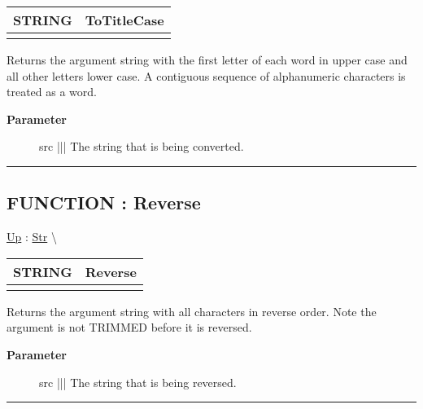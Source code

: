 {\renewcommand{\arraystretch}{1.5}
\begin{tabularx}{\textwidth}{|>{\raggedright\arraybackslash}l|X|}
\hline
\hspace{0pt}STRING & ToTitleCase \\
\hline
\multicolumn{2}{|>{\raggedright\arraybackslash}X|}{\hspace{0pt}(STRING src)} \\
\hline
\end{tabularx}
}

\par
Returns the argument string with the first letter of each word in upper case and all other letters lower case. A contiguous sequence of alphanumeric characters is treated as a word.

\par
\begin{description}
\item [\textbf{Parameter}] src ||| The string that is being converted.
\end{description}

\rule{\linewidth}{0.5pt}
\subsection*{FUNCTION : Reverse}
\hypertarget{ecldoc:str.reverse}{}
\hyperlink{ecldoc:Str}{Up} :
\hspace{0pt} \hyperlink{ecldoc:Str}{Str} \textbackslash 

{\renewcommand{\arraystretch}{1.5}
\begin{tabularx}{\textwidth}{|>{\raggedright\arraybackslash}l|X|}
\hline
\hspace{0pt}STRING & Reverse \\
\hline
\multicolumn{2}{|>{\raggedright\arraybackslash}X|}{\hspace{0pt}(STRING src)} \\
\hline
\end{tabularx}
}

\par
Returns the argument string with all characters in reverse order. Note the argument is not TRIMMED before it is reversed.

\par
\begin{description}
\item [\textbf{Parameter}] src ||| The string that is being reversed.
\end{description}

\rule{\linewidth}{0.5pt}
